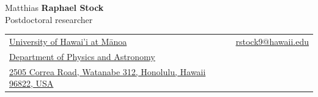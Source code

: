 \documentclass[letterpaper,12pt, oneside]{article}
\newlength{\cvHeaderRuleGap}
\newlength{\cvHeaderTableBottomGap}
\begin{document}
\begin{center}
\LARGE{Matthias \textbf{Raphael Stock}} \\
\normalsize{{Postdoctoral researcher}}

\end{center}
\vspace{-2.2ex}
\hrulefill

\normalsize

\vspace{\cvHeaderRuleGap}
\begin{center}
\begin{tabular}{l l l}
\href{https://manoa.hawaii.edu/}{University of Hawai'i at Mānoa} & \hspace{0.25in} & \href{mailto:rstock9@hawaii.edu}{rstock9@hawaii.edu} \\
\href{https://www.phys.hawaii.edu/}{Department of Physics and Astronomy} & \hspace{0.25in} & \\
\href{https://www.openstreetmap.org/?#map=19/21.298379/-157.816177}{2505 Correa Road, Watanabe 312, Honolulu, Hawaii 96822, USA} & & \\
 \end{tabular}
\end{center}

\vspace{\cvHeaderTableBottomGap}
\end{document}

